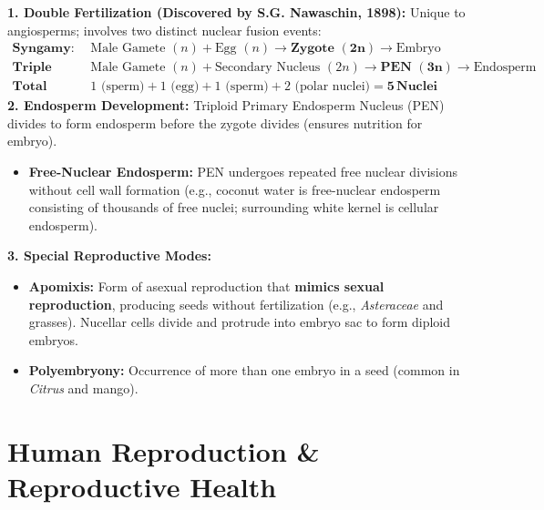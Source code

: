 \documentclass[10pt,a4paper]{article}
\begin{document}
\begin{formulabox}
\textbf{1. Double Fertilization (Discovered by S.G. Nawaschin, 1898):}
Unique to angiosperms; involves two distinct nuclear fusion events:
\begin{align*}
  \textbf{Syngamy: } & \text{Male Gamete } (n) + \text{Egg } (n) \longrightarrow \mathbf{\text{Zygote } (2n)} \longrightarrow \text{Embryo}\\
  \textbf{Triple Fusion: } & \text{Male Gamete } (n) + \text{Secondary Nucleus } (2n) \longrightarrow \mathbf{\text{PEN } (3n)} \longrightarrow \text{Endosperm}\\
  \textbf{Total Nuclei: } & 1 \text{ (sperm)} + 1 \text{ (egg)} + 1 \text{ (sperm)} + 2 \text{ (polar nuclei)} = \mathbf{5\,\text{Nuclei}}
\end{align*}
\textbf{2. Endosperm Development:}
Triploid Primary Endosperm Nucleus (PEN) divides to form endosperm before the zygote divides (ensures nutrition for embryo).
\begin{itemize}
  \item \textbf{Free-Nuclear Endosperm:} PEN undergoes repeated free nuclear divisions without cell wall formation (e.g., coconut water is free-nuclear endosperm consisting of thousands of free nuclei; surrounding white kernel is cellular endosperm).
\end{itemize}
\textbf{3. Special Reproductive Modes:}
\begin{itemize}
  \item \textbf{Apomixis:} Form of asexual reproduction that \textbf{mimics sexual reproduction}, producing seeds without fertilization (e.g., \textit{Asteraceae} and grasses). Nucellar cells divide and protrude into embryo sac to form diploid embryos.
  \item \textbf{Polyembryony:} Occurrence of more than one embryo in a seed (common in \textit{Citrus} and mango).
\end{itemize}
\end{formulabox}

\section{Human Reproduction \& Reproductive Health}
\end{document}
